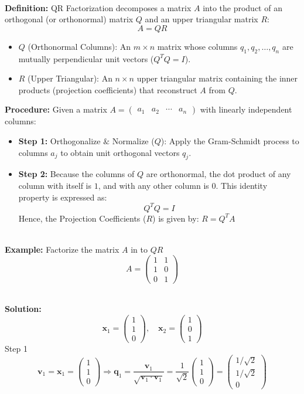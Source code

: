 \documentclass[DIV=20,oneside]{scrartcl}
\newcommand{\solution}{
	\noindent\textbf{\\Solution: }
}
\newcommand{\example}{
	\noindent\textbf{\\Example: }
}
\newcommand{\deff}{
	\noindent\textbf{\\Definition: }
}
\begin{document}
\deff QR Factorization decomposes a matrix $A$ into the product of an orthogonal (or orthonormal) matrix $Q$ and an upper triangular matrix $R$:$$A = QR$$
\begin{itemize}
	\item $Q$ (Orthonormal Columns): An $m \times n$ matrix whose columns $q_1, q_2, \dots, q_n$ are mutually perpendicular unit vectors ($Q^T Q = I$).
	\item $R$ (Upper Triangular): An $n \times n$ upper triangular matrix containing the inner products (projection coefficients) that reconstruct $A$ from $Q$.
\end{itemize}
\textbf{Procedure: } Given a matrix $A = \begin{pmatrix} a_1 & a_2 & \cdots & a_n \end{pmatrix}$ with linearly independent columns:
\begin{itemize}
	\item \textbf{Step 1:} Orthogonalize $\&$ Normalize ($Q$): Apply the Gram-Schmidt process to columns $a_j$ to obtain unit orthogonal vectors $q_j$.
	\item \textbf{Step 2:} Because the columns of $Q$ are orthonormal, the dot product of any column with itself is $1$, and with any other column is $0$. This identity property is expressed as:$$Q^T Q = I$$
	Hence, the Projection Coefficients ($R$) is given by: $R = Q^T A$ 
\end{itemize}
\example Factorize the matrix $A$ in to $QR$
$$A = \begin{pmatrix} 1 & 1 \\ 1 & 0 \\ 0 & 1 \end{pmatrix}$$
\solution $$\mathbf{x}_1 = \begin{pmatrix} 1 \\ 1 \\ 0 \end{pmatrix}, \quad \mathbf{x}_2 = \begin{pmatrix} 1 \\ 0 \\ 1 \end{pmatrix}$$Step 1$$\mathbf{v}_1 = \mathbf{x}_1 = \begin{pmatrix} 1 \\ 1 \\ 0 \end{pmatrix}\Rightarrow \mathbf{q}_1 = \frac{\mathbf{v}_1}{\sqrt{\mathbf{v}_1 \cdot \mathbf{v}_1}} = \frac{1}{\sqrt{2}} \begin{pmatrix} 1 \\ 1 \\ 0 \end{pmatrix} = \begin{pmatrix} 1/\sqrt{2} \\ 1/\sqrt{2} \\ 0 \end{pmatrix}$$
\end{document}
